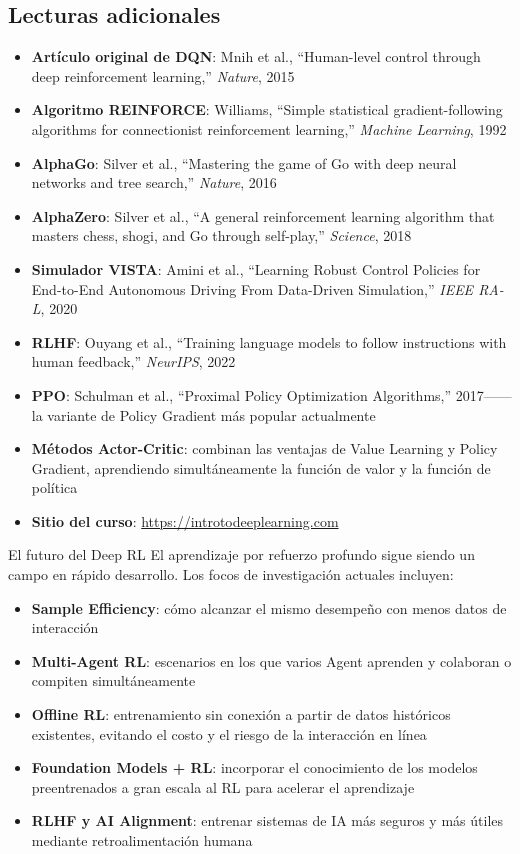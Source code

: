 \subsection{Lecturas adicionales}

\begin{itemize}
    \item \textbf{Artículo original de DQN}: Mnih et al., ``Human-level control through deep reinforcement learning,'' \textit{Nature}, 2015
    \item \textbf{Algoritmo REINFORCE}: Williams, ``Simple statistical gradient-following algorithms for connectionist reinforcement learning,'' \textit{Machine Learning}, 1992
    \item \textbf{AlphaGo}: Silver et al., ``Mastering the game of Go with deep neural networks and tree search,'' \textit{Nature}, 2016
    \item \textbf{AlphaZero}: Silver et al., ``A general reinforcement learning algorithm that masters chess, shogi, and Go through self-play,'' \textit{Science}, 2018
    \item \textbf{Simulador VISTA}: Amini et al., ``Learning Robust Control Policies for End-to-End Autonomous Driving From Data-Driven Simulation,'' \textit{IEEE RA-L}, 2020
    \item \textbf{RLHF}: Ouyang et al., ``Training language models to follow instructions with human feedback,'' \textit{NeurIPS}, 2022
    \item \textbf{PPO}: Schulman et al., ``Proximal Policy Optimization Algorithms,'' 2017------la variante de Policy Gradient más popular actualmente
    \item \textbf{Métodos Actor-Critic}: combinan las ventajas de Value Learning y Policy Gradient, aprendiendo simultáneamente la función de valor y la función de política
    \item \textbf{Sitio del curso}: \url{https://introtodeeplearning.com}
\end{itemize}

\begin{knowledgebox}{El futuro del Deep RL}
El aprendizaje por refuerzo profundo sigue siendo un campo en rápido desarrollo. Los focos de investigación actuales incluyen:
\begin{itemize}
    \item \textbf{Sample Efficiency}: cómo alcanzar el mismo desempeño con menos datos de interacción
    \item \textbf{Multi-Agent RL}: escenarios en los que varios Agent aprenden y colaboran o compiten simultáneamente
    \item \textbf{Offline RL}: entrenamiento sin conexión a partir de datos históricos existentes, evitando el costo y el riesgo de la interacción en línea
    \item \textbf{Foundation Models + RL}: incorporar el conocimiento de los modelos preentrenados a gran escala al RL para acelerar el aprendizaje
    \item \textbf{RLHF y AI Alignment}: entrenar sistemas de IA más seguros y más útiles mediante retroalimentación humana
\end{itemize}
\end{knowledgebox}




